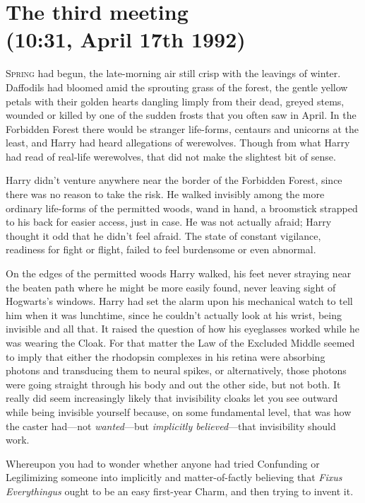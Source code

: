 
\section{The third meeting\\
(10:31\am, April 17th 1992)}

\lettrine{S}{pring} had begun, the late-morning air still crisp with the leavings of winter. Daffodils had bloomed amid the sprouting grass of the forest, the gentle yellow petals with their golden hearts dangling limply from their dead, greyed stems, wounded or killed by one of the sudden frosts that you often saw in April. In the Forbidden Forest there would be stranger life-forms, centaurs and unicorns at the least, and Harry had heard allegations of werewolves. Though from what Harry had read of real-life werewolves, that did not make the slightest bit of sense.

Harry didn’t venture anywhere near the border of the Forbidden Forest, since there was no reason to take the risk. He walked invisibly among the more ordinary life-forms of the permitted woods, wand in hand, a broomstick strapped to his back for easier access, just in case. He was not actually afraid; Harry thought it odd that he didn’t feel afraid. The state of constant vigilance, readiness for fight or flight, failed to feel burdensome or even abnormal.

On the edges of the permitted woods Harry walked, his feet never straying near the beaten path where he might be more easily found, never leaving sight of Hogwarts’s windows. Harry had set the alarm upon his mechanical watch to tell him when it was lunchtime, since he couldn’t actually look at his wrist, being invisible and all that. It raised the question of how his eyeglasses worked while he was wearing the Cloak. For that matter the Law of the Excluded Middle seemed to imply that either the rhodopsin complexes in his retina were absorbing photons and transducing them to neural spikes, or alternatively, those photons were going straight through his body and out the other side, but not both. It really did seem increasingly likely that invisibility cloaks let you see outward while being invisible yourself because, on some fundamental level, that was how the caster had—not \emph{wanted}—but \emph{implicitly believed}—that invisibility should work.

Whereupon you had to wonder whether anyone had tried Confunding or Legilimizing someone into implicitly and matter-of-factly believing that \emph{Fixus Everythingus} ought to be an easy first-year Charm, and then trying to invent it.

